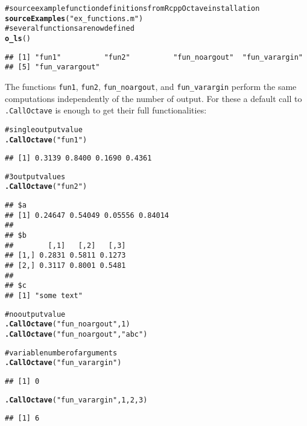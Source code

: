 \documentclass[english,10pt,a4paper]{article}\usepackage{graphicx, color}
\makeatletter
\newcommand{\hlfunctioncall}[1]{\textcolor[rgb]{0.501960784313725,0,0.329411764705882}{\textbf{#1}}}%
\newcommand{\hlstring}[1]{\textcolor[rgb]{0.6,0.6,1}{#1}}%
\newcommand{\hlcomment}[1]{\textcolor[rgb]{0.180392156862745,0.6,0.341176470588235}{#1}}%
\newenvironment{kframe}{%
 \def\at@end@of@kframe{}%
 \ifinner\ifhmode%
  \def\at@end@of@kframe{\end{minipage}}%
  \begin{minipage}{\columnwidth}%
 \fi\fi%
 \def\FrameCommand##1{\hskip\@totalleftmargin \hskip-\fboxsep
 \colorbox{shadecolor}{##1}\hskip-\fboxsep
     \hskip-\linewidth \hskip-\@totalleftmargin \hskip\columnwidth}%
 \MakeFramed {\advance\hsize-\width
   \@totalleftmargin\z@ \linewidth\hsize
   \@setminipage}}%
 {\par\unskip\endMakeFramed%
 \at@end@of@kframe}
\newenvironment{knitrout}{}{} %
\let\code=\texttt
\makeatother
\begin{document}
\begin{knitrout}
\color{fgcolor}\begin{kframe}
\begin{alltt}
\hlcomment{# source example function definitions from RcppOctave installation}
\hlfunctioncall{sourceExamples}(\hlstring{"ex_functions.m"})
\hlcomment{# several functions are now defined}
\hlfunctioncall{o_ls}()
\end{alltt}
\begin{verbatim}
## [1] "fun1"          "fun2"          "fun_noargout"  "fun_varargin" 
## [5] "fun_varargout"
\end{verbatim}
\end{kframe}
\end{knitrout}


The functions \code{fun1}, \code{fun2}, \code{fun\_noargout}, and
\code{fun\_varargin} perform the same computations independently of the number
of output.
For these a default call to \code{.CallOctave} is enough to get their full
functionalities:

\begin{knitrout}
\color{fgcolor}\begin{kframe}
\begin{alltt}
\hlcomment{# single output value}
\hlfunctioncall{.CallOctave}(\hlstring{"fun1"})
\end{alltt}
\begin{verbatim}
## [1] 0.3139 0.8400 0.1690 0.4361
\end{verbatim}
\begin{alltt}
\hlcomment{# 3 output values}
\hlfunctioncall{.CallOctave}(\hlstring{"fun2"})
\end{alltt}
\begin{verbatim}
## $a
## [1] 0.24647 0.54049 0.05556 0.84014
## 
## $b
##        [,1]   [,2]   [,3]
## [1,] 0.2831 0.5811 0.1273
## [2,] 0.3117 0.8001 0.5481
## 
## $c
## [1] "some text"
\end{verbatim}
\begin{alltt}

\hlcomment{# no output value}
\hlfunctioncall{.CallOctave}(\hlstring{"fun_noargout"}, 1)
\hlfunctioncall{.CallOctave}(\hlstring{"fun_noargout"}, \hlstring{"abc"})

\hlcomment{# variable number of arguments}
\hlfunctioncall{.CallOctave}(\hlstring{"fun_varargin"})
\end{alltt}
\begin{verbatim}
## [1] 0
\end{verbatim}
\begin{alltt}
\hlfunctioncall{.CallOctave}(\hlstring{"fun_varargin"}, 1, 2, 3)
\end{alltt}
\begin{verbatim}
## [1] 6
\end{verbatim}
\end{kframe}
\end{knitrout}
\end{document}
